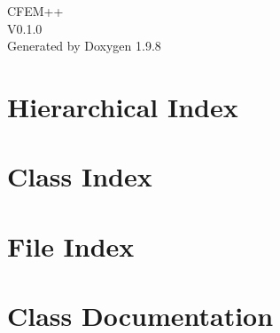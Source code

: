\documentclass[twoside]{book}
\newcommand{\+}{\discretionary{\mbox{\scriptsize$\hookleftarrow$}}{}{}}
\newcommand{\clearemptydoublepage}{%
    \newpage{\pagestyle{empty}\cleardoublepage}%
  }
\begin{document}
  \raggedbottom
    \hypersetup{pageanchor=false,
                bookmarksnumbered=true,
                pdfencoding=unicode
               }
  \begin{titlepage}
  \vspace*{7cm}
  \begin{center}%
  {\Large CFEM++}\\
  [1ex]\large V0.\+1.\+0 \\
  \vspace*{1cm}
  {\large Generated by Doxygen 1.9.8}\\
  \end{center}
  \end{titlepage}
  \clearemptydoublepage
  \tableofcontents
  \clearemptydoublepage
  \hypersetup{pageanchor=true}

\chapter{Hierarchical Index}

\chapter{Class Index}

\chapter{File Index}

\chapter{Class Documentation}





































\end{document}
